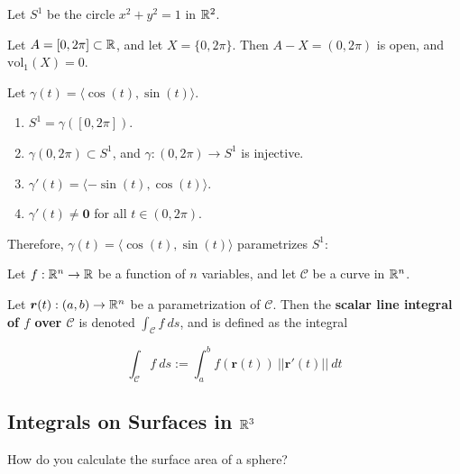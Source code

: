 \begin{example}
    Let $S^1$ be the circle $x^2+y^2=1$ in $\mathbb{R}^2$.
    
    Let $A = [0,2\pi] \subset \mathbb{R}$, and let $X = \{0, 2\pi\}$.  Then $A-X = (0,2\pi)$ is open, and $\text{vol}_1(X) = 0$.

    Let $\gamma(t) = \langle \cos(t) , \sin(t) \rangle$.


        \begin{enumerate}
        
        \item $S^1 = \gamma([0,2\pi])$.
        \item $\gamma(0,2\pi) \subset S^1$, and $\gamma : (0,2\pi) \to S^1$ is injective. 
        
        \item $\gamma'(t) = \langle -\sin(t), \cos(t) \rangle$.
        \item $\gamma'(t) \neq \bm{0}$ for all $t \in (0,2\pi)$.
    \end{enumerate}

    
    Therefore, $\gamma(t) = \langle \cos(t), \sin(t) \rangle$ parametrizes $S^1$:
    \end{example}

    \begin{definition}
    Let $f : \mathbb{R}^n \to \mathbb{R}$ be a function of $n$ variables, and let $\mathcal{C}$ be a curve in $\mathbb{R}^n$.

    Let $\bm{r}(t) : (a,b) \to \mathbb{R}^n$ be a parametrization of $\mathcal{C}$.  Then the \textbf{scalar line integral  of $f$ over $\mathcal{C}$} is denoted $\int_\mathcal{C} f \ ds$, and is defined as the integral

    $$\int_\mathcal{C} f \ ds := \int_a^b f(\bm{r}(t)) \ ||\bm{r}'(t)|| \ dt$$
    \end{definition}


\subsection{Integrals on Surfaces in $\mathbb{R}^3$}

\begin{motivating}
    How do you calculate the surface area of a sphere?
\end{motivating}


